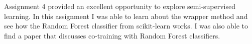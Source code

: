 Assignment 4 provided an excellent opportunity to explore semi-supervised learning. In this assignment I was able to learn about the wrapper method and see how the Random Forest classifier from scikit-learn works. I was also able to find a paper that discusses co-training with Random Forest classifiers.

